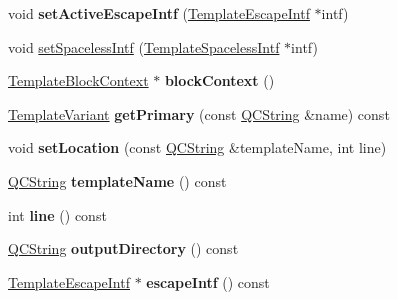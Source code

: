 \begin{DoxyCompactItemize}
void {\bfseries set\+Active\+Escape\+Intf} (\mbox{\hyperlink{class_template_escape_intf}{Template\+Escape\+Intf}} $\ast$intf)
\item 
void \mbox{\hyperlink{class_template_context_impl_a70bde90b2b3c08769cd0c7587ffaf33a}{set\+Spaceless\+Intf}} (\mbox{\hyperlink{class_template_spaceless_intf}{Template\+Spaceless\+Intf}} $\ast$intf)
\item 
\mbox{\label{class_template_context_impl_aa95cf328b6caf850d094d38e39487fd8}} 
\mbox{\hyperlink{class_template_block_context}{Template\+Block\+Context}} $\ast$ {\bfseries block\+Context} ()
\item 
\mbox{\label{class_template_context_impl_ab27977185400431bd890056168b77977}} 
\mbox{\hyperlink{class_template_variant}{Template\+Variant}} {\bfseries get\+Primary} (const \mbox{\hyperlink{class_q_c_string}{Q\+C\+String}} \&name) const
\item 
\mbox{\label{class_template_context_impl_afb0b4a00e7ab9bcfbc37e52103d4f587}} 
void {\bfseries set\+Location} (const \mbox{\hyperlink{class_q_c_string}{Q\+C\+String}} \&template\+Name, int line)
\item 
\mbox{\label{class_template_context_impl_a56fa510c50b85b56c9eb066521f04f84}} 
\mbox{\hyperlink{class_q_c_string}{Q\+C\+String}} {\bfseries template\+Name} () const
\item 
\mbox{\label{class_template_context_impl_a136a505a96784f0fe90769a22ff7c7a3}} 
int {\bfseries line} () const
\item 
\mbox{\label{class_template_context_impl_ab3769ef66cafaafacef2e14b19403123}} 
\mbox{\hyperlink{class_q_c_string}{Q\+C\+String}} {\bfseries output\+Directory} () const
\item 
\mbox{\label{class_template_context_impl_aee36243b9d60323d435b5a9aaed419e5}} 
\mbox{\hyperlink{class_template_escape_intf}{Template\+Escape\+Intf}} $\ast$ {\bfseries escape\+Intf} () const
\item 
\mbox{\label{class_template_context_impl_ae36cc38704bf2685bd3ea08080a3d52b}} 

\end{DoxyCompactItemize}
